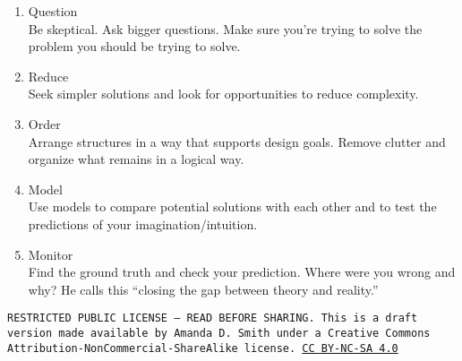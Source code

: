 \documentclass[10pt]{article}
\begin{document}
\begin{enumerate}
    \item Question\\ Be skeptical. Ask bigger questions. Make sure you're trying to solve the problem you should be trying to solve.
      \item Reduce\\ Seek simpler solutions and look for opportunities to reduce complexity.
      \item Order\\ Arrange structures in a way that supports design goals. Remove clutter and organize what remains in a logical way.
      \item Model\\ Use models to compare potential solutions with each other and to test the predictions of your imagination/intuition.
      \item Monitor\\ Find the ground truth and check your prediction. Where were you wrong and why? He calls this ``closing the gap between theory and reality.'' \cite{Grant2007-yc}
\end{enumerate}


\bigskip

\noindent
\texttt{\footnotesize RESTRICTED PUBLIC LICENSE --- READ BEFORE SHARING. This is a draft version made available by Amanda D. Smith under a Creative Commons Attribution-NonCommercial-ShareAlike license. 
\href{https://creativecommons.org/licenses/by-nc-sa/4.0/}{CC BY-NC-SA 4.0}}


\printbibliography
\end{document}
